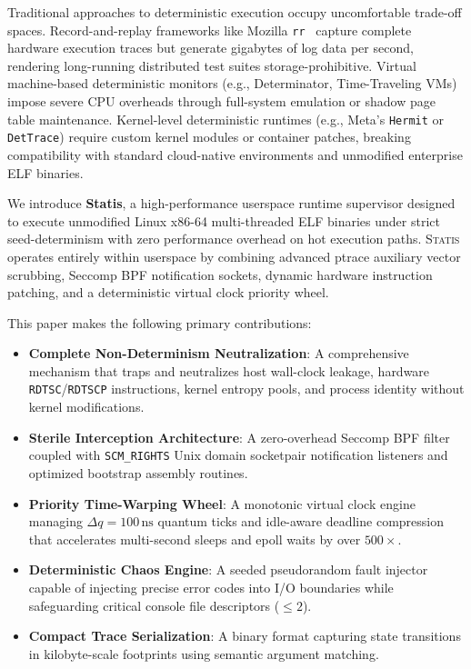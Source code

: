 \documentclass[twocolumn,10pt,sigconf,nonacm]{acmart}
\begin{document}
Traditional approaches to deterministic execution occupy uncomfortable trade-off spaces. Record-and-replay frameworks like Mozilla \texttt{rr}~\cite{rr} capture complete hardware execution traces but generate gigabytes of log data per second, rendering long-running distributed test suites storage-prohibitive. Virtual machine-based deterministic monitors (e.g., Determinator, Time-Traveling VMs) impose severe CPU overheads through full-system emulation or shadow page table maintenance. Kernel-level deterministic runtimes (e.g., Meta's \texttt{Hermit} or \texttt{DetTrace}) require custom kernel modules or container patches, breaking compatibility with standard cloud-native environments and unmodified enterprise ELF binaries.

We introduce \textbf{Statis}, a high-performance userspace runtime supervisor designed to execute unmodified Linux x86-64 multi-threaded ELF binaries under strict seed-determinism with zero performance overhead on hot execution paths. \textsc{Statis} operates entirely within userspace by combining advanced ptrace auxiliary vector scrubbing, Seccomp BPF notification sockets, dynamic hardware instruction patching, and a deterministic virtual clock priority wheel. 

This paper makes the following primary contributions:
\begin{itemize}
    \item \textbf{Complete Non-Determinism Neutralization}: A comprehensive mechanism that traps and neutralizes host wall-clock leakage, hardware \texttt{RDTSC}/\texttt{RDTSCP} instructions, kernel entropy pools, and process identity without kernel modifications.
    \item \textbf{Sterile Interception Architecture}: A zero-overhead Seccomp BPF filter coupled with \texttt{SCM\_RIGHTS} Unix domain socketpair notification listeners and optimized bootstrap assembly routines.
    \item \textbf{Priority Time-Warping Wheel}: A monotonic virtual clock engine managing $\Delta q = 100\,\text{ns}$ quantum ticks and idle-aware deadline compression that accelerates multi-second sleeps and epoll waits by over $500\times$.
    \item \textbf{Deterministic Chaos Engine}: A seeded pseudorandom fault injector capable of injecting precise error codes into I/O boundaries while safeguarding critical console file descriptors ($\le 2$).
    \item \textbf{Compact Trace Serialization}: A binary format capturing state transitions in kilobyte-scale footprints using semantic argument matching.
\end{itemize}
\end{document}
